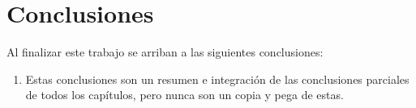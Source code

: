 \chapter*{Conclusiones}
Al finalizar este trabajo se arriban a las siguientes conclusiones:
\begin{enumerate}
	\item Estas conclusiones son un resumen e integración de las conclusiones parciales de todos los capítulos, pero nunca son un copia y pega de estas.
\end{enumerate}